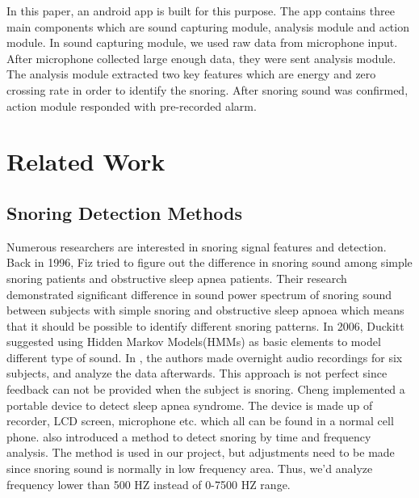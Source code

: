 \documentclass[conference]{IEEEtran}
\begin{document}
In this paper, an android app is built for this purpose. The app contains three main components which are sound capturing module, analysis module and action module. In sound capturing module, we used raw data from microphone input. After microphone collected large enough data, they were sent analysis module. The analysis module extracted two key features which are energy and zero crossing rate in order to identify the snoring. After snoring sound was confirmed, action module responded with pre-recorded alarm.

\section{Related Work} %
\label{sec:related_work}

\subsection{Snoring Detection Methods} %
\label{sub:snoring_detection_methods}

	Numerous researchers are interested in snoring signal features and detection. Back in 1996, Fiz tried to figure out the difference in snoring sound among simple snoring patients and obstructive sleep apnea patients\cite{fiz1996acoustic}. Their research demonstrated significant difference in sound power spectrum of snoring sound between subjects with simple snoring and obstructive sleep apnoea which means that it should be possible to identify different snoring patterns. In 2006, Duckitt\cite{duckitt2006automatic} suggested using Hidden Markov Models(HMMs) as basic elements to model different type of sound. In \cite{duckitt2006automatic}, the authors made overnight audio recordings for six subjects, and analyze the data afterwards. This approach is not perfect since feedback can not be provided when the subject is snoring. Cheng\cite{cheng2008development} implemented a portable device to detect sleep apnea syndrome. The device is made up of recorder, LCD screen, microphone etc. which all can be found in a normal cell phone. \cite{ccavucsouglu2007efficient} also introduced a method to detect snoring by time and frequency analysis. The method is used in our project, but adjustments need to be made since snoring sound is normally in low frequency area\cite{pevernagie2010acoustics}\cite{calabrese2011system}. Thus, we'd analyze frequency lower than 500 HZ instead of 0-7500 HZ range. 
	
\end{document}
